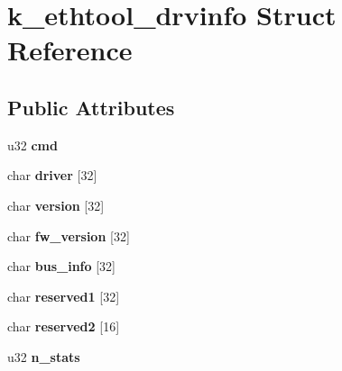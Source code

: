 \hypertarget{structk__ethtool__drvinfo}{
\section{k\_\-ethtool\_\-drvinfo Struct Reference}
\label{structk__ethtool__drvinfo}
}
\subsection*{Public Attributes}
\begin{DoxyCompactItemize}
\item 
\hypertarget{structk__ethtool__drvinfo_aee7aa6c9a588422c2dcd2c746a8329fc}{
u32 {\bfseries cmd}}
\label{structk__ethtool__drvinfo_aee7aa6c9a588422c2dcd2c746a8329fc}

\item 
\hypertarget{structk__ethtool__drvinfo_a98eea0246e9cd12aa61cd6f4699e7771}{
char {\bfseries driver} \mbox{[}32\mbox{]}}
\label{structk__ethtool__drvinfo_a98eea0246e9cd12aa61cd6f4699e7771}

\item 
\hypertarget{structk__ethtool__drvinfo_a90f7a4e42091da405fdb3379f0057fb5}{
char {\bfseries version} \mbox{[}32\mbox{]}}
\label{structk__ethtool__drvinfo_a90f7a4e42091da405fdb3379f0057fb5}

\item 
\hypertarget{structk__ethtool__drvinfo_a0b6e990c1bebe5b53bde612646a25577}{
char {\bfseries fw\_\-version} \mbox{[}32\mbox{]}}
\label{structk__ethtool__drvinfo_a0b6e990c1bebe5b53bde612646a25577}

\item 
\hypertarget{structk__ethtool__drvinfo_a1094fc3a116146858d8c074fceba74f1}{
char {\bfseries bus\_\-info} \mbox{[}32\mbox{]}}
\label{structk__ethtool__drvinfo_a1094fc3a116146858d8c074fceba74f1}

\item 
\hypertarget{structk__ethtool__drvinfo_a7d529beb22ba3257b6adf225ceec86ce}{
char {\bfseries reserved1} \mbox{[}32\mbox{]}}
\label{structk__ethtool__drvinfo_a7d529beb22ba3257b6adf225ceec86ce}

\item 
\hypertarget{structk__ethtool__drvinfo_a4ce733dbe05ce6bc7e08a6ab374d09dc}{
char {\bfseries reserved2} \mbox{[}16\mbox{]}}
\label{structk__ethtool__drvinfo_a4ce733dbe05ce6bc7e08a6ab374d09dc}

\item 
\hypertarget{structk__ethtool__drvinfo_a2628d50dcb0995084d05dd2ab7cd8642}{
u32 {\bfseries n\_\-stats}}
\label{structk__ethtool__drvinfo_a2628d50dcb0995084d05dd2ab7cd8642}


\end{DoxyCompactItemize}
